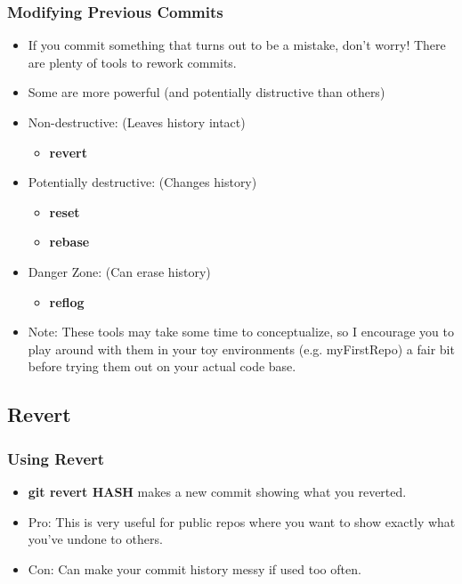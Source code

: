 \documentclass{beamer}
\begin{document}
\begin{frame}
	\frametitle{Modifying Previous Commits}
	\begin{itemize}
		\item If you commit something that turns out to be a mistake, don't worry! There are plenty of tools to rework commits.
		\item Some are more powerful (and potentially distructive than others)
		\item Non-destructive: (Leaves history intact)
		\begin{itemize}
			\item \textbf{revert}
		\end{itemize}
		\item Potentially destructive: (Changes history)
		\begin{itemize}
			\item \textbf{reset}
			\item \textbf{rebase}
		\end{itemize}
		\item Danger Zone: (Can erase history)
		\begin{itemize}
			\item \textbf{reflog}
		\end{itemize}
		\item Note: These tools may take some time to conceptualize, so I encourage you to play around with them in your toy environments (e.g. myFirstRepo) a fair bit before trying them out on your actual code base. 
	\end{itemize}
\end{frame}

\subsection{Revert}

\begin{frame}[fragile]
	\frametitle{Using Revert}
	\begin{itemize}
		\item \textbf{git revert \textlangle{}HASH\textrangle{}} makes a new commit showing what you reverted.
		\item Pro: This is very useful for public repos where you want to show exactly what you've undone to others.
		\item Con: Can make your commit history messy if used too often. 
	\end{itemize}
\end{frame}
\end{document}
